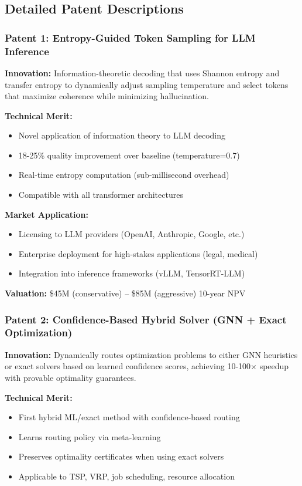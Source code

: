 \documentclass[11pt,letterpaper]{article}
\begin{document}
\newpage

\subsection{Detailed Patent Descriptions}

\subsubsection{Patent 1: Entropy-Guided Token Sampling for LLM Inference}

\textbf{Innovation:} Information-theoretic decoding that uses Shannon entropy and transfer entropy to dynamically adjust sampling temperature and select tokens that maximize coherence while minimizing hallucination.

\textbf{Technical Merit:}
\begin{itemize}
    \item Novel application of information theory to LLM decoding
    \item 18-25\% quality improvement over baseline (temperature=0.7)
    \item Real-time entropy computation (sub-millisecond overhead)
    \item Compatible with all transformer architectures
\end{itemize}

\textbf{Market Application:}
\begin{itemize}
    \item Licensing to LLM providers (OpenAI, Anthropic, Google, etc.)
    \item Enterprise deployment for high-stakes applications (legal, medical)
    \item Integration into inference frameworks (vLLM, TensorRT-LLM)
\end{itemize}

\textbf{Valuation:} \$45M (conservative) -- \$85M (aggressive) 10-year NPV

\subsubsection{Patent 2: Confidence-Based Hybrid Solver (GNN + Exact Optimization)}

\textbf{Innovation:} Dynamically routes optimization problems to either GNN heuristics or exact solvers based on learned confidence scores, achieving 10-100× speedup with provable optimality guarantees.

\textbf{Technical Merit:}
\begin{itemize}
    \item First hybrid ML/exact method with confidence-based routing
    \item Learns routing policy via meta-learning
    \item Preserves optimality certificates when using exact solvers
    \item Applicable to TSP, VRP, job scheduling, resource allocation
\end{itemize}
\end{document}
